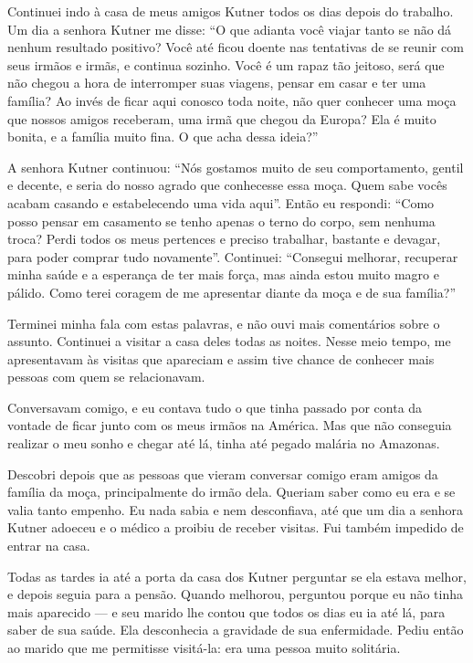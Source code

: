 Continuei indo à casa de meus amigos Kutner todos os dias depois do
trabalho. Um dia a senhora Kutner me disse: ``O que adianta você viajar
tanto se não dá nenhum resultado positivo? Você até ficou doente
nas tentativas de se reunir com seus irmãos e irmãs, e continua
sozinho. Você é um rapaz tão jeitoso, será que não chegou a hora de interromper 
suas viagens, pensar em casar e ter uma família? Ao invés de ficar
aqui conosco toda noite, não quer conhecer uma moça que nossos amigos
receberam, uma irmã que chegou da Europa? Ela é muito bonita, e a família
muito fina. O que acha dessa ideia?''

A senhora Kutner continuou: ``Nós gostamos muito de seu comportamento,
gentil e decente, e seria do nosso agrado que conhecesse essa moça.
Quem sabe vocês acabam casando e estabelecendo uma vida aqui''. Então
eu respondi: ``Como posso pensar em casamento se tenho apenas o
terno do corpo, sem nenhuma troca? Perdi todos os
meus pertences e preciso trabalhar, bastante e devagar, para poder comprar tudo novamente''. Continuei: ``Consegui melhorar, recuperar minha saúde e a esperança de ter mais força, mas ainda estou muito magro e
pálido. Como terei coragem de me apresentar diante da moça e de sua
família?''

Terminei minha fala com estas palavras, e não ouvi mais comentários sobre o assunto. 
Continuei a visitar a casa deles todas as
noites. Nesse meio tempo, me apresentavam às visitas que apareciam e assim
tive chance de conhecer mais pessoas com quem se relacionavam.

Conversavam comigo, e eu contava tudo o que tinha passado por conta da
vontade de ficar junto com os meus irmãos na América. Mas que não 
conseguia realizar o meu sonho e chegar até lá, tinha até 
pegado malária no Amazonas.

Descobri depois que as pessoas que vieram conversar comigo eram
amigos da família da moça, principalmente do irmão dela. Queriam saber
como eu era e se valia tanto empenho. Eu nada sabia e nem
desconfiava, até que um dia a senhora Kutner adoeceu e o médico a proibiu
de receber visitas. Fui também impedido de entrar na casa.

Todas as tardes ia até a porta da casa dos Kutner perguntar se ela
estava melhor, e depois seguia para a pensão. Quando melhorou, perguntou
porque eu não tinha mais aparecido --- e seu marido lhe contou que todos os
dias eu ia até lá, para saber de sua saúde. Ela desconhecia a 
gravidade de sua enfermidade. Pediu então ao marido que me permitisse visitá-la: era 
uma pessoa muito solitária.

